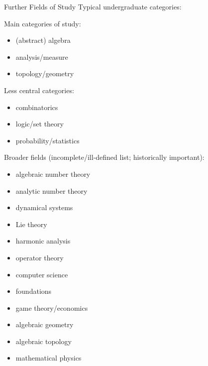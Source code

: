 \documentclass{beamer}
\theoremstyle{plain}
\begin{document}
\begin{frame}{Further Fields of Study}
  Typical undergraduate categories: 
  \begin{center}
    \begin{minipage}{0.45\textwidth}
      Main categories of study:
      \begin{itemize}
        \item (abstract) algebra       
        \item analysis/measure                           
       \item topology/geometry
      \end{itemize}
    \end{minipage}
    \pause
  \begin{minipage}{0.45\textwidth}
   Less central categories:
    \begin{itemize}
      \item combinatorics
      \item logic/set theory
      \item probability/statistics
    \end{itemize} 
  \end{minipage}
  \end{center}
  \pause
  Broader fields (incomplete/ill-defined list; historically important): 
  \begin{center}
   \begin{multicols}{3}
    \begin{itemize}
      \item algebraic number theory
      \item analytic number theory
      \item dynamical systems
      \item Lie theory
      \item harmonic analysis
      \item operator theory
      \item computer science
      \item foundations
      \item game theory/economics
      \item algebraic geometry
      \item algebraic topology
      \item mathematical physics 
    \end{itemize}
  \end{multicols} 
  \end{center}
\end{frame}
\end{document}
